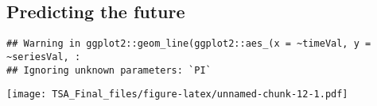 \documentclass[
]{article}
\newenvironment{Shaded}{\begin{snugshade}}{\end{snugshade}}
\newcommand{\AttributeTok}[1]{\textcolor[rgb]{0.77,0.63,0.00}{#1}}
\newcommand{\ConstantTok}[1]{\textcolor[rgb]{0.00,0.00,0.00}{#1}}
\newcommand{\DecValTok}[1]{\textcolor[rgb]{0.00,0.00,0.81}{#1}}
\newcommand{\FunctionTok}[1]{\textcolor[rgb]{0.00,0.00,0.00}{#1}}
\newcommand{\NormalTok}[1]{#1}
\newcommand{\OtherTok}[1]{\textcolor[rgb]{0.56,0.35,0.01}{#1}}
\newcommand{\SpecialCharTok}[1]{\textcolor[rgb]{0.00,0.00,0.00}{#1}}
\newcommand{\StringTok}[1]{\textcolor[rgb]{0.31,0.60,0.02}{#1}}
\begin{document}
\hypertarget{predicting-the-future}{%
\subsection{Predicting the future}\label{predicting-the-future}}

\begin{Shaded}
\end{Shaded}

\begin{verbatim}
## Warning in ggplot2::geom_line(ggplot2::aes_(x = ~timeVal, y = ~seriesVal, :
## Ignoring unknown parameters: `PI`
\end{verbatim}

\texttt{[image: TSA\_Final\_files/figure-latex/unnamed-chunk-12-1.pdf]}
\end{document}
